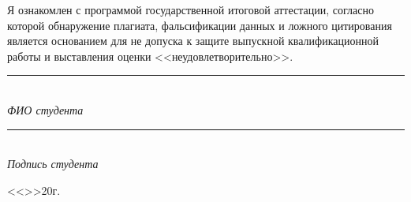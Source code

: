 Я ознакомлен с программой государственной итоговой аттестации, согласно которой обнаружение плагиата, фальсификации данных и ложного цитирования является основанием для не допуска к защите выпускной квалификационной работы и выставления оценки <<неудовлетворительно>>.

\vspace{18mm}

\noindent
\begin{minipage}[t]{0.42\textwidth}
\centering
\rule{\linewidth}{0.4pt}\\
\textit{ФИО студента}
\end{minipage}
\hfill
\begin{minipage}[t]{0.42\textwidth}
\centering
\rule{\linewidth}{0.4pt}\\
\textit{Подпись студента}
\end{minipage}

\vspace{10mm}

\noindent <<\uline{\hspace{10mm}}>>\uline{\hspace{32mm}}20\uline{\hspace{7mm}}г.
